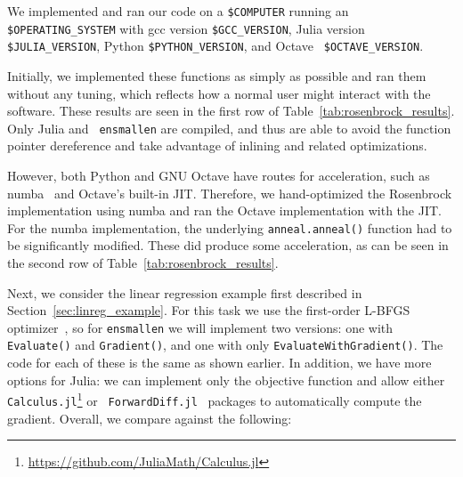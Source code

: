 \documentclass{article}
\begin{document}
We implemented and ran our code on a {\tt \$COMPUTER} running an {\tt
\$OPERATING\_SYSTEM} with gcc version {\tt \$GCC\_VERSION}, Julia version {\tt
\$JULIA\_VERSION}, Python {\tt \$PYTHON\_VERSION}, and Octave {\tt
\$OCTAVE\_VERSION}.

Initially, we implemented these functions as simply as possible and ran them
without any tuning, which reflects how a normal user might interact with the
software.  These results are seen in the first row of
Table~\ref{tab:rosenbrock_results}.  Only Julia and {\tt
ensmallen} are compiled, and thus are able to avoid the function pointer
dereference and take advantage of inlining and related optimizations.



However, both Python and GNU Octave have routes for acceleration, such as
numba~\cite{TODO} and Octave's built-in JIT.  Therefore, we hand-optimized the
Rosenbrock implementation using numba and ran the Octave implementation with the
JIT.  For the numba implementation, the underlying {\tt anneal.anneal()}
function had to be significantly modified.  These did produce some acceleration,
as can be seen in the second row of Table~\ref{tab:rosenbrock_results}.

Next, we consider the linear regression example first described in Section~\ref{sec:linreg_example}.
For this task we use the first-order L-BFGS optimizer~\cite{zhu1997algorithm},
so for {\tt ensmallen} we will implement two versions: one with {\tt Evaluate()}
and {\tt Gradient()}, and one with only {\tt EvaluateWithGradient()}.  The code
for each of these is the same as shown earlier.  In addition, we have more
options for Julia: we can implement only the objective function and allow either
{\tt Calculus.jl}\footnote{\url{https://github.com/JuliaMath/Calculus.jl}} or {\tt
ForwardDiff.jl}~\cite{RevelsLubinPapamarkou2016} packages to automatically
compute the gradient.  Overall, we compare against the following:
\end{document}

